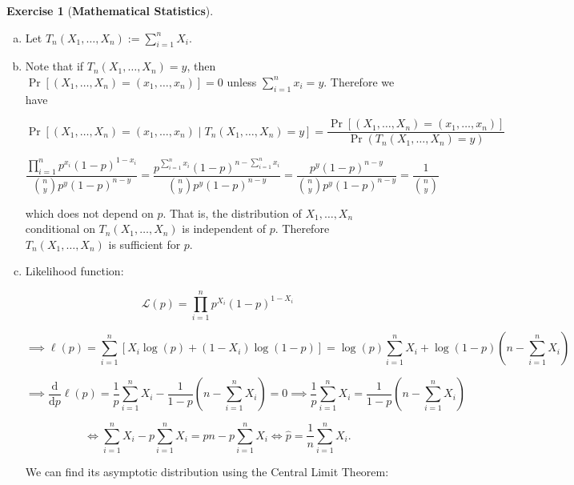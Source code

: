 \documentclass{article}
\theoremstyle{definition}
\newtheorem{exercise}{Exercise}
\theoremstyle{definition}
\theoremstyle{definition}
\theoremstyle{definition}
\theoremstyle{definition}
\newcommand{\deriv}[2]{\frac{\mathrm{d} #1}{\mathrm{d} #2}}
\begin{document}
\begin{exercise}[\textbf{Mathematical Statistics}]

\begin{enumerate}[(a)]

\item Let \(\boxed{T_n (X_1, \ldots, X_n) := \sum_{i=1}^n X_i.}\) 


\item Note that if \(T_n(X_1, \ldots, X_n) = y\), then \(\Pr \left[  (X_1, \ldots, X_n)  = (x_1, \ldots, x_n)  \right] = 0\) unless \(\sum_{i=1}^n x_i = y\). Therefore we have

\[
\Pr \left[  (X_1, \ldots, X_n)  = (x_1, \ldots, x_n) \mid T_n (X_1, \ldots, X_n) = y  \right] = \frac{\Pr \left[  (X_1, \ldots, X_n)  = (x_1, \ldots, x_n)  \right] }{\Pr\left(  T_n (X_1, \ldots, X_n) = y \right)}
\]

%
\[
\frac{\prod_{i=1}^n p^{x_i} (1-p)^{1-x_i}}{\binom{n}{y} p^y(1-p)^{n-y}} = \frac{ p^{\sum_{i=1}^n x_i} (1-p)^{n-\sum_{i=1}^n x_i}}{\binom{n}{y} p^y(1-p)^{n-y}}   = \frac{ p^{y} (1-p)^{n-y}}{\binom{n}{y} p^y(1-p)^{n-y}}   = \frac{1}{\binom{n}{y}}
\]

which does not depend on \(p\). That is, the distribution of \(X_1, \ldots, X_n\) conditional on \(T_n(X_1, \ldots, X_n)\) is independent of \(p\). Therefore \(T_n(X_1, \ldots, X_n)\) is sufficient for \(p\).


\item Likelihood function:

\[
\mathcal{L}(p) = \prod_{i=1}^n p^{X_i} (1-p)^{1-X_i} 
\]


\[
\implies \ell(p) = \sum_{i=1}^n \left[ X_i \log(p) + (1-X_i) \log(1-p) \right] = \log(p)  \sum_{i=1}^n X_i +  \log(1-p)\left(n -  \sum_{i=1}^n  X_i \right) 
\]

\[
\implies \deriv{}{p} \ell(p) =\frac{1}{p}  \sum_{i=1}^n X_i - \frac{1}{1-p}\left(n -  \sum_{i=1}^n  X_i \right) = 0 \implies \frac{1}{p}  \sum_{i=1}^n X_i  = \frac{1}{1-p}\left(n -  \sum_{i=1}^n  X_i \right)
\]

\[
\iff  \sum_{i=1}^n X_i - p  \sum_{i=1}^n X_i= pn - p \sum_{i=1}^n X_i \iff \boxed{ \hat{p} = \frac{1}{n} \sum_{i=1}^n X_i.}
\]

We can find its asymptotic distribution using the Central Limit Theorem:



\end{enumerate}
\end{exercise}
\end{document}
